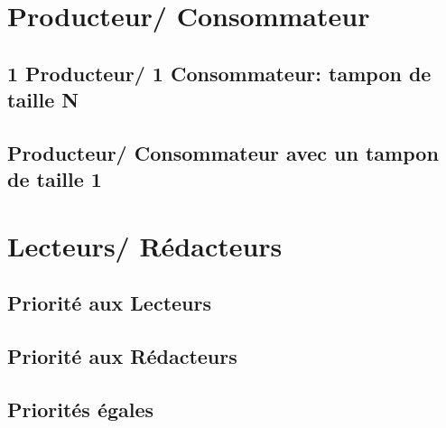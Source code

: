 \documentclass[11pt,a4paper]{article}
\begin{document}
\section{Producteur/ Consommateur}
\subsection{1 Producteur/ 1 Consommateur: tampon de taille N}
\begin{scriptsize}
    
\end{scriptsize}
\newpage
\subsection{Producteur/ Consommateur avec un tampon de taille 1}
\begin{scriptsize}
    
\end{scriptsize}
\newpage
\section{Lecteurs/ Rédacteurs}
\subsection{Priorité aux Lecteurs}
\begin{scriptsize}
    
\end{scriptsize}
\newpage
\subsection{Priorité aux Rédacteurs}
\begin{scriptsize}
    
\end{scriptsize}
\newpage
\subsection{Priorités égales}
\end{document}
